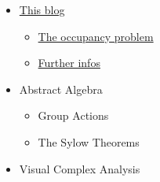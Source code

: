 

\begin{itemize}

\item \href{https://probabilityandstats.wordpress.com}{This blog}

\begin{itemize}

\item \href{https://probabilityandstats.wordpress.com/2010/03/27/the-occupancy-problem/}{The occupancy problem}

  \item \href{https://probabilityandstats.wordpress.com/2010/04/04/a-formula-for-the-occupancy-problem/}{Further infos}
  
\end{itemize}

\item Abstract Algebra

\begin{itemize}

\item Group Actions

\item The Sylow Theorems
  
\end{itemize}

\item Visual Complex Analysis

\end{itemize}


